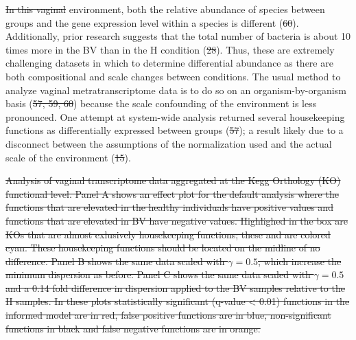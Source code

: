 \documentclass[
]{article}
\makeatletter
\newcommand*\pandocbounded[1]{%
  \sbox\pandoc@box{#1}%
  \Gscale@div\@tempa{\textheight}{\dimexpr\ht\pandoc@box+\dp\pandoc@box\relax}%
  \Gscale@div\@tempb{\linewidth}{\wd\pandoc@box}%
  \ifdim\@tempb\p@<\@tempa\p@\let\@tempa\@tempb\fi%
  \ifdim\@tempa\p@<\p@\scalebox{\@tempa}{\usebox\pandoc@box}%
  \else\usebox{\pandoc@box}%
  \fi%
}
\providecommand{\DIFadd}[1]{{\protect\color{blue}\uwave{#1}}} %
\providecommand{\DIFdel}[1]{{\protect\color{red}\sout{#1}}}                      %
\providecommand{\DIFaddbegin}{} %
\providecommand{\DIFaddend}{} %
\providecommand{\DIFdelbegin}{} %
\providecommand{\DIFdelend}{} %
\providecommand{\DIFdelFL}[1]{\DIFdel{#1}} %
\newcommand{\DIFscaledelfig}{0.5}
\newlength{\DIFdelgraphicswidth} %
\newlength{\DIFdelgraphicsheight} %
\newcommand{\DIFaddincludegraphics}[2][]{{\color{blue}\fbox{\DIFOincludegraphics[#1]{#2}}}} %
\newcommand{\DIFdelincludegraphics}[2][]{%
\sbox{\DIFdelgraphicsbox}{\DIFOincludegraphics[#1]{#2}}%
\settoboxwidth{\DIFdelgraphicswidth}{\DIFdelgraphicsbox} %
\settoboxtotalheight{\DIFdelgraphicsheight}{\DIFdelgraphicsbox} %
\scalebox{\DIFscaledelfig}{%
\parbox[b]{\DIFdelgraphicswidth}{\usebox{\DIFdelgraphicsbox}\\[-\baselineskip] \rule{\DIFdelgraphicswidth}{0em}}\llap{\resizebox{\DIFdelgraphicswidth}{\DIFdelgraphicsheight}{%
\setlength{\unitlength}{\DIFdelgraphicswidth}%
\begin{picture}(1,1)%
\thicklines\linethickness{2pt} %
{\color[rgb]{1,0,0}\put(0,0){\framebox(1,1){}}}%
{\color[rgb]{1,0,0}\put(0,0){\line( 1,1){1}}}%
{\color[rgb]{1,0,0}\put(0,1){\line(1,-1){1}}}%
\end{picture}%
}\hspace*{3pt}}} %
} %
\DeclareRobustCommand{\DIFaddbegin}{\DIFOaddbegin \let\includegraphics\DIFaddincludegraphics} %
\DeclareRobustCommand{\DIFaddend}{\DIFOaddend \let\includegraphics\DIFOincludegraphics} %
\DeclareRobustCommand{\DIFdelbegin}{\DIFOdelbegin \let\includegraphics\DIFdelincludegraphics} %
\DeclareRobustCommand{\DIFdelend}{\DIFOaddend \let\includegraphics\DIFOincludegraphics} %
\makeatother
\begin{document}
\DIFdel{In this vaginal }\DIFdelend \DIFaddbegin \DIFadd{In this }\DIFaddend environment, both the
relative abundance of species between groups and the gene expression
level within a species is different (\DIFdelbegin \DIFdel{60}\DIFdelend \DIFaddbegin \DIFadd{51}\DIFaddend ). Additionally, prior research
suggests that the total number of bacteria is about 10 times more in the
BV than in the H condition (\DIFdelbegin \DIFdel{28}\DIFdelend \DIFaddbegin \DIFadd{26}\DIFaddend ). Thus, these are extremely challenging
datasets in which to determine differential abundance as there are both
compositional and scale changes between conditions. The usual method to
analyze vaginal metratranscriptome data is to do so on an
organism-by-organism basis (\DIFdelbegin \DIFdel{57, 59, 60}\DIFdelend \DIFaddbegin \DIFadd{51--53}\DIFaddend ) because the scale confounding of the
environment is less pronounced. One attempt at system-wide analysis
returned several housekeeping functions as differentially expressed
between groups (\DIFdelbegin \DIFdel{57}\DIFdelend \DIFaddbegin \DIFadd{52}\DIFaddend ); a result likely due to a disconnect between the
assumptions of the normalization used and the actual scale of the
environment (\DIFdelbegin \DIFdel{15}\DIFdelend \DIFaddbegin \DIFadd{19}\DIFaddend ).

\DIFdelbegin %
{%
\DIFdelFL{Analysis of vaginal transcriptome data aggregated at the Kegg
Orthology (KO) functional level. Panel A shows an effect plot for the
default analysis where the functions that are elevated in the healthy
individuals have positive values and functions that are elevated in BV
have negative values. Highlighed in the box are KOs that are almost
exlusively housekeeping functions; these and are colored cyan. These
housekeeping functions should be located on the midline of no
difference. Panel B shows the same data scaled with \(\gamma = 0.5\),
which increase the minimum dispersion as before. Panel C shows the same
data scaled with \(\gamma = 0.5\) and a 0.14 fold difference in
dispersion applied to the BV samples relative to the H samples. In these
plots statistically significant (q-value \textless{} 0.01) functions in
the informed model are in red, false positive functions are in blue,
non-significant functions in black and false negative functions are in
orange.}}
\end{document}
